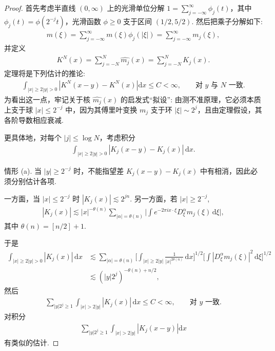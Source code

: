 \begin{proof}
首先考虑半直线 $(0,\infty)$ 上的光滑单位分解 $1=\sum_{j=-\infty}^{\infty}\phi_{j}(t)$，其中 $\phi_{j}(t)=\phi(2^{-j}t)$，光滑函数 $\phi\geq 0$ 支于区间 $(1/2,5/2)$. 然后把乘子分解如下:
\begin{align*}
  m(\xi)=\sum_{j=-\infty}^{\infty}m(\xi)\phi_{j}(|\xi|)=\sum_{j=-\infty}^{\infty}m_{j}(\xi),
\end{align*}
并定义
\begin{align*}
  K^{N}(x)=\sum_{j=-N}^{N}\widehat{m_{j}}(x)=\sum_{j=-N}^{N}K_{j}(x).
\end{align*}
定理将是下列估计的推论:
\begin{align*}
  \int_{\left|x\right|\geq 2\left|y\right|>0}\left|K^{N}(x-y)-K^{N}(x)\right|\mathrm{d}x\le C<\infty,\qquad \text{对 } y \text{ 与 } N \text{ 一致}.
\end{align*}
为看出这一点，牢记关于核 $\widehat{m_j}(x)$ 的启发式``拟设'': 由测不准原理，它必须本质上支于球 $|x| \leq 2^{-j}$ 中，因为其傅里叶变换 $m_j$ 支于环 $|\xi| \sim 2^j$，且由定理假设，其各阶导数相应衰减.

更具体地，对每个 $|j| \leq \log N$，考虑积分
\begin{align*}
  \int_{|x|\geq 2|y|>0}|K_{j}(x-y)-K_{j}(x)|\,\mathrm{d}x.
\end{align*}

情形 (a). 当 $|y| \geq 2^{-j}$ 时，不能指望差 $K_j(x - y) - K_j(x)$ 中有相消，因此必须分别估计各项.

一方面，当 $|x| \leq 2^{-j}$ 时 $|K_j(x)| \lesssim 2^{jn}$. 另一方面，若 $|x| \geq 2^{-j}$,
\begin{align*}
  |K_{j}(x)|\lesssim|x|^{-\theta(n)}\sum_{|\alpha|=\theta(n)}
  \Big|\int e^{-2\pi i x\cdot\xi}D_{\xi}^{\alpha}m_{j}(\xi)\,\mathrm{d}\xi\Big|,
\end{align*}
其中 $\theta(n) = [n/2] + 1$.

于是
\begin{align*}
  \int_{|x|\geq 2|y|>0}|K_{j}(x)|\,\mathrm{d}x
  &\lesssim\sum_{|\alpha|=\theta(n)}
   \Big[\int_{|x|\geq 2|y|}\frac{1}{|x|^{2\theta(n)}}\,\mathrm{d}x\Big]^{1/2}
   \Big[\int|D^{\alpha}_{\xi}m_{j}(\xi)|^{2}\,\mathrm{d}\xi\Big]^{1/2}\\
  &\lesssim(|y|2^{j})^{-\theta(n)+n/2},
\end{align*}
然后
\begin{align*}
  \sum_{|y|2^{j}\geq 1}\int_{|x|>2|y|}|K_{j}(x)|\,\mathrm{d}x\leq C<\infty,\qquad \text{对 } y \text{ 一致}.
\end{align*}
对积分
\begin{align*}
  \sum_{\left|y\right|2^{j}\geq 1}\int_{\left|x\right|>2\left|y\right|}\left|K_{j}(x-y)\right|\mathrm{d}x
\end{align*}
有类似的估计.


\end{proof}
